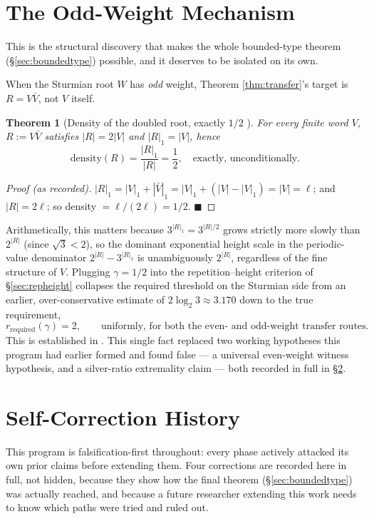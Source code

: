 \documentclass[11pt]{article}
\newtheorem{theorem}{Theorem}[section]
\begin{document}
\section{The Odd-Weight Mechanism}
\label{sec:oddweight}

This is the structural discovery that makes the whole bounded-type theorem (\S\ref{sec:boundedtype}) possible, and it deserves to be isolated on its own.

When the Sturmian root $W$ has \emph{odd} weight, Theorem \ref{thm:transfer}'s target is $R=V\bar V$, not $V$ itself.

\begin{theorem}[Density of the doubled root, exactly $1/2$ \cite{Phase4Required}]
For every finite word $V$, $R:=V\bar V$ satisfies $|R|=2|V|$ and $|R|_1=|V|$, hence
\[
\text{density}(R) = \frac{|R|_1}{|R|} = \frac12, \quad\text{exactly, unconditionally.}
\]
\end{theorem}
\begin{proof}[Proof (as recorded)]
$|R|_1 = |V|_1 + |\bar V|_1 = |V|_1 + (|V|-|V|_1) = |V| = \ell$; and $|R|=2\ell$; so density $=\ell/(2\ell)=1/2$. $\blacksquare$
\end{proof}

Arithmetically, this matters because $3^{|R|_1}=3^{|R|/2}$ grows strictly more slowly than $2^{|R|}$ (since $\sqrt3<2$), so the dominant exponential height scale in the periodic-value denominator $2^{|R|}-3^{|R|_1}$ is unambiguously $2^{|R|}$, regardless of the fine structure of $V$. Plugging $\gamma=1/2$ into the repetition--height criterion of \S\ref{sec:repheight} collapses the required threshold on the Sturmian side from an earlier, over-conservative estimate of $2\log_2 3\approx3.170$ down to the true requirement,
\[
r_{\text{required}}(\gamma) = 2, \qquad\text{uniformly, for both the even- and odd-weight transfer routes.}
\]
This is established in \cite{Phase4Required}. This single fact replaced two working hypotheses this program had earlier formed and found false --- a universal even-weight witness hypothesis, and a silver-ratio extremality claim --- both recorded in full in \S\ref{sec:selfcorrection}.

\section{Self-Correction History}
\label{sec:selfcorrection}

This program is falsification-first throughout: every phase actively attacked its own prior claims before extending them. Four corrections are recorded here in full, not hidden, because they show how the final theorem (\S\ref{sec:boundedtype}) was actually reached, and because a future researcher extending this work needs to know which paths were tried and ruled out.
\end{document}
